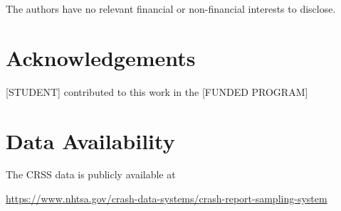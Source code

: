 \documentclass[fleqn]{cas-sc}
\begin{document}
The authors have no relevant financial or non-financial interests to disclose.

\section*{Acknowledgements}

[STUDENT]
contributed to this work in the 
[FUNDED PROGRAM]

\section*{Data Availability}

The CRSS data is publicly available at 

\url{https://www.nhtsa.gov/crash-data-systems/crash-report-sampling-system}


\begin{comment}
\begin{figure}[<options>]
	\centering
		\texttt{[image: ]}
	  \caption{}\label{fig1}
\end{figure}


\begin{table}[<options>]
\caption{}\label{tbl1}
\begin{tabular*}{\tblwidth}{@{}LL@{}}
\toprule
  &  \\ %
\midrule
 & \\
 & \\
 & \\
 & \\
\bottomrule
\end{tabular*}
\end{table}
\end{comment}




\section{}\label{}

\printcredits

%





\begin{comment}
\bio{}
\endbio

\bio{pic1}
\endbio
\end{comment}
\end{document}
